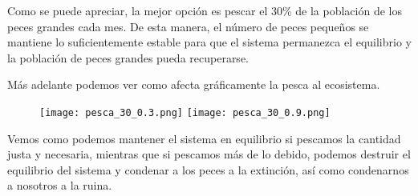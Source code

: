 Como se puede apreciar, la mejor opción es pescar el 30\% de la población de los peces grandes cada mes. De esta manera, el número de peces pequeños se mantiene lo suficientemente estable para que el sistema permanezca el equilibrio y la población de peces grandes pueda recuperarse.

Más adelante podemos ver como afecta gráficamente la pesca al ecosistema.

\begin{figure}[h!]
\texttt{[image: pesca\_30\_0.3.png]}
\texttt{[image: pesca\_30\_0.9.png]}
\centering
\end{figure}

Vemos como podemos mantener el sistema en equilibrio si pescamos la cantidad justa y necesaria, mientras que si pescamos más de lo debido, podemos destruir el equilibrio del sistema y condenar a los peces a la extinción, así como condenarnos a nosotros a la ruina.

